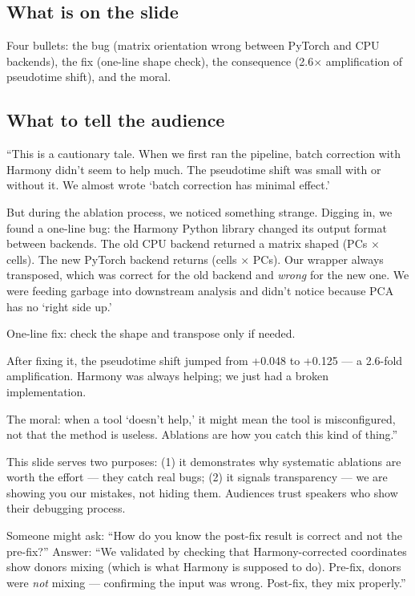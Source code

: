 \documentclass[11pt]{article}
\begin{document}
\subsection{What is on the slide}

Four bullets: the bug (matrix orientation wrong between PyTorch and CPU backends), the fix (one-line shape check), the consequence (2.6$\times$ amplification of pseudotime shift), and the moral.

\subsection{What to tell the audience}

\begin{speaknote}
``This is a cautionary tale. When we first ran the pipeline, batch correction with Harmony didn't seem to help much. The pseudotime shift was small with or without it. We almost wrote `batch correction has minimal effect.'

But during the ablation process, we noticed something strange. Digging in, we found a one-line bug: the Harmony Python library changed its output format between backends. The old CPU backend returned a matrix shaped (PCs $\times$ cells). The new PyTorch backend returns (cells $\times$ PCs). Our wrapper always transposed, which was correct for the old backend and \emph{wrong} for the new one. We were feeding garbage into downstream analysis and didn't notice because PCA has no `right side up.'

One-line fix: check the shape and transpose only if needed.

After fixing it, the pseudotime shift jumped from +0.048 to +0.125 --- a 2.6-fold amplification. Harmony was always helping; we just had a broken implementation.

The moral: when a tool `doesn't help,' it might mean the tool is misconfigured, not that the method is useless. Ablations are how you catch this kind of thing.''
\end{speaknote}

\begin{whyblock}
This slide serves two purposes: (1) it demonstrates why systematic ablations are worth the effort --- they catch real bugs; (2) it signals transparency --- we are showing you our mistakes, not hiding them. Audiences trust speakers who show their debugging process.
\end{whyblock}

\begin{pitfall}
Someone might ask: ``How do you know the post-fix result is correct and not the pre-fix?'' Answer: ``We validated by checking that Harmony-corrected coordinates show donors mixing (which is what Harmony is supposed to do). Pre-fix, donors were \emph{not} mixing --- confirming the input was wrong. Post-fix, they mix properly.''
\end{pitfall}
\end{document}
